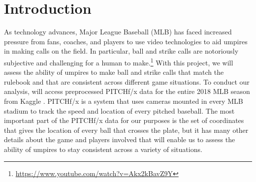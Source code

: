 \documentclass[bj, preprint]{imsart}
\begin{document}
\section{Introduction}\label{sec:intro}
As technology advances, Major League Baseball (MLB) has faced increased pressure from fans, coaches, and players to use video technologies to aid umpires in making calls on the field.
In particular, ball and strike calls are notoriously subjective and challenging for a human to make.\footnote{\url{https://www.youtube.com/watch?v=Akx2kBavZ9Y}}
With this project, we will assess the ability of umpires to make ball and strike calls that match the rulebook and that are consistent across different game situations. 
To conduct our analysis, will access preprocessed PITCHf/x data for the entire 2018 MLB season from Kaggle \citep{schale2019mlb}. 
PITCHf/x is a system that uses cameras mounted in every MLB stadium to track the speed and location of every pitched baseball. 
The most important part of the PITCHf/x data for our purposes is the set of coordinates that gives the location of every ball that crosses the plate, but it has many other details about the game and players involved that will enable us to assess the ability of umpires to stay consistent across a variety of situations.

\end{document}
